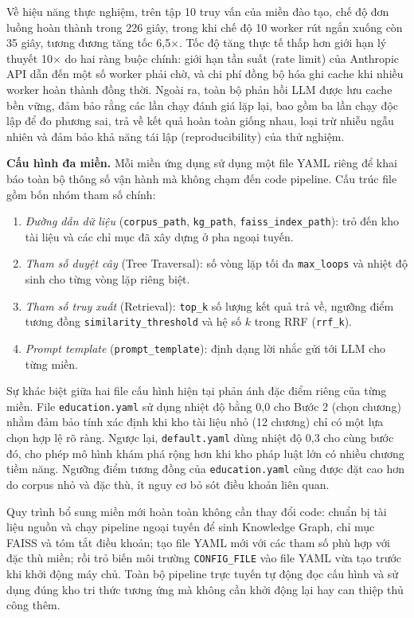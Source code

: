 Về hiệu năng thực nghiệm, trên tập 10 truy vấn của miền đào tạo, chế độ đơn luồng
hoàn thành trong 226 giây, trong khi chế độ 10 worker rút ngắn xuống còn 35 giây,
tương đương tăng tốc 6,5$\times$. Tốc độ tăng thực tế thấp hơn giới hạn lý thuyết 10$\times$
do hai ràng buộc chính: giới hạn tần suất (rate limit) của Anthropic API dẫn đến một
số worker phải chờ, và chi phí đồng bộ hóa ghi cache khi nhiều worker hoàn thành
đồng thời. Ngoài ra, toàn bộ phản hồi LLM được lưu cache bền vững, đảm bảo rằng
các lần chạy đánh giá lặp lại, bao gồm ba lần chạy độc lập để đo phương sai, trả
về kết quả hoàn toàn giống nhau, loại trừ nhiễu ngẫu nhiên và đảm bảo khả năng tái
lập (reproducibility) của thử nghiệm.

\textbf{Cấu hình đa miền.} Mỗi miền ứng dụng sử dụng một file YAML riêng để khai báo
toàn bộ thông số vận hành mà không chạm đến code pipeline. Cấu trúc file gồm bốn
nhóm tham số chính:
\begin{enumerate}
  \item \textit{Đường dẫn dữ liệu} (\texttt{corpus\_path}, \texttt{kg\_path}, \texttt{faiss\_index\_path}): trỏ đến kho tài liệu và các chỉ mục đã xây dựng ở pha ngoại tuyến.
  \item \textit{Tham số duyệt cây} (Tree Traversal): số vòng lặp tối đa \texttt{max\_loops} và nhiệt độ sinh cho từng vòng lặp riêng biệt.
  \item \textit{Tham số truy xuất} (Retrieval): \texttt{top\_k} số lượng kết quả trả về, ngưỡng điểm tương đồng \texttt{similarity\_threshold} và hệ số $k$ trong RRF (\texttt{rrf\_k}).
  \item \textit{Prompt template} (\texttt{prompt\_template}): định dạng lời nhắc gửi tới LLM cho từng miền.
\end{enumerate}

Sự khác biệt giữa hai file cấu hình hiện tại phản ánh đặc điểm riêng của từng miền.
File \texttt{education.yaml} sử dụng nhiệt độ bằng 0,0 cho Bước 2 (chọn chương) nhằm
đảm bảo tính xác định khi kho tài liệu nhỏ (12 chương) chỉ có một lựa chọn hợp lệ rõ
ràng. Ngược lại, \texttt{default.yaml} dùng nhiệt độ 0,3 cho cùng bước đó, cho phép mô
hình khám phá rộng hơn khi kho pháp luật lớn có nhiều chương tiềm năng. Ngưỡng
điểm tương đồng của \texttt{education.yaml} cũng được đặt cao hơn do corpus nhỏ và
đặc thù, ít nguy cơ bỏ sót điều khoản liên quan.

Quy trình bổ sung miền mới hoàn toàn không cần thay đổi code: chuẩn bị tài liệu
nguồn và chạy pipeline ngoại tuyến để sinh Knowledge Graph, chỉ mục FAISS và tóm
tắt điều khoản; tạo file YAML mới với các tham số phù hợp với đặc thù miền; rồi
trỏ biến môi trường \texttt{CONFIG\_FILE} vào file YAML vừa tạo trước khi khởi động
máy chủ. Toàn bộ pipeline trực tuyến tự động đọc cấu hình và sử dụng đúng kho tri
thức tương ứng mà không cần khởi động lại hay can thiệp thủ công thêm.

